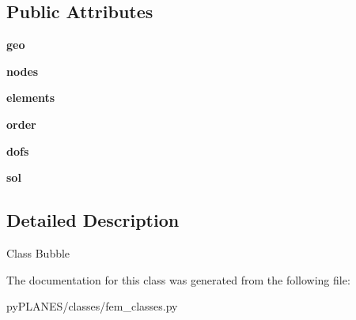 \subsection*{Public Attributes}
\begin{DoxyCompactItemize}
\item 
\mbox{\label{classpy_p_l_a_n_e_s_1_1classes_1_1fem__classes_1_1_bubble_ae7340b9bacc1270a2bcbab76c9639f55}} 
{\bfseries geo}
\item 
\mbox{\label{classpy_p_l_a_n_e_s_1_1classes_1_1fem__classes_1_1_bubble_a0b381174344ecf7b21240952a3afabbf}} 
{\bfseries nodes}
\item 
\mbox{\label{classpy_p_l_a_n_e_s_1_1classes_1_1fem__classes_1_1_bubble_a9b87f713b3ebb8bfa17cfa0aed5d81b3}} 
{\bfseries elements}
\item 
\mbox{\label{classpy_p_l_a_n_e_s_1_1classes_1_1fem__classes_1_1_bubble_af1326ce8e97accefc40b952f83a15fef}} 
{\bfseries order}
\item 
\mbox{\label{classpy_p_l_a_n_e_s_1_1classes_1_1fem__classes_1_1_bubble_a9a3166dee69b5dd5e4ec50c1b2c70eef}} 
{\bfseries dofs}
\item 
\mbox{\label{classpy_p_l_a_n_e_s_1_1classes_1_1fem__classes_1_1_bubble_a22c84328d6e58c23bbba9faf23a40a93}} 
{\bfseries sol}
\end{DoxyCompactItemize}


\subsection{Detailed Description}
\begin{DoxyVerb}Class Bubble \end{DoxyVerb}
 

The documentation for this class was generated from the following file\+:\begin{DoxyCompactItemize}
\item 
py\+P\+L\+A\+N\+E\+S/classes/fem\+\_\+classes.\+py\end{DoxyCompactItemize}
